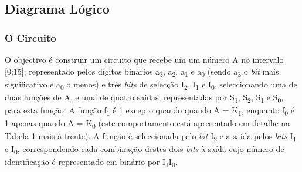 \documentclass[a4paper,12pt]{article}
\begin{document}
\subsection{Diagrama Lógico}
\subsubsection{O Circuito}
O objectivo é construir um circuito que recebe um um número A no intervalo [0;15], representado pelos dígitos binários a\textsubscript{3}, a\textsubscript{2}, a\textsubscript{1} e a\textsubscript{0} (sendo a\textsubscript{3} o {\it bit} mais significativo e a\textsubscript{0} o menos) e três {\it bits} de selecção I\textsubscript{2}, I\textsubscript{1} e I\textsubscript{0}, seleccionando uma de duas funções de A, e uma de quatro saídas, representadas por S\textsubscript{3}, S\textsubscript{2}, S\textsubscript{1} e S\textsubscript{0}, para esta função. A função f\textsubscript{1} é 1 excepto quando quando A = K\textsubscript{1}, enquanto f\textsubscript{0} é 1 apenas quando A = K\textsubscript{0} (este comportamento está apresentado em detalhe na Tabela 1 mais à frente). A função é seleccionada pelo {\it bit} I\textsubscript{2} e a saída pelos {\it bits} I\textsubscript{1} e I\textsubscript{0}, correspondendo cada combinação destes dois {\it bits} à saída cujo número de identificação é representado em binário por I\textsubscript{1}I\textsubscript{0}.
\par
\end{document}
